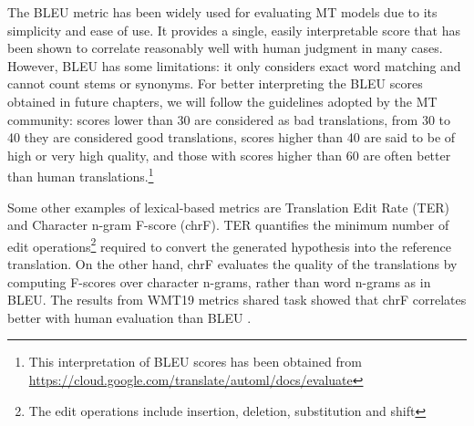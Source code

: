 \documentclass[11pt,english,listoffigures,listoftables]{tfgetsinf}
\begin{document}






The BLEU metric has been widely used for evaluating MT models due to its simplicity and ease of use. It provides a single, easily interpretable score that has been shown to correlate reasonably well with human judgment in many cases. However, BLEU has some limitations: it only considers exact word matching and cannot count stems or synonyms. For better interpreting the BLEU scores obtained in future chapters, we will follow the guidelines adopted by the MT community: scores lower than 30 are considered as bad translations, from 30 to 40 they are considered good translations, scores higher than 40 are said to be of high or very high quality, and those with scores higher than 60 are often better than human translations.\footnote{This interpretation of BLEU scores has been obtained from \url{https://cloud.google.com/translate/automl/docs/evaluate}}


Some other examples of lexical-based metrics are Translation Edit Rate (TER) and Character n-gram F-score (chrF). TER \cite{snover-etal-2006-ter} quantifies the minimum number of edit operations\footnote{The edit operations include insertion, deletion, substitution and shift} required to convert the generated hypothesis into the reference translation. On the other hand, chrF \cite{popovic-2015-chrf} evaluates the quality of the translations by computing F-scores over character n-grams, rather than word n-grams as in BLEU. The results from WMT19 metrics shared task showed that chrF correlates better with human evaluation than BLEU \cite{ma-etal-wmt19}.
\end{document}
